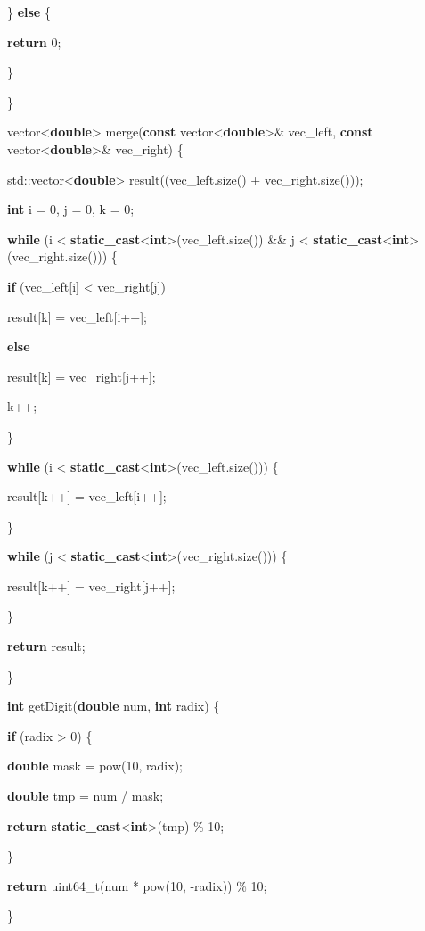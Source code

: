 \documentclass[]{article}
\begin{document}
\} \textbf{else} \{

\textbf{return} 0;

\}

\}

vector\textless{}\textbf{double}\textgreater{} merge(\textbf{const}
vector\textless{}\textbf{double}\textgreater{}\& vec\_left,
\textbf{const} vector\textless{}\textbf{double}\textgreater{}\&
vec\_right) \{

std::vector\textless{}\textbf{double}\textgreater{}
result((vec\_left.size() + vec\_right.size()));

\textbf{int} i = 0, j = 0, k = 0;

\textbf{while} (i \textless{}
\textbf{static\_cast}\textless{}\textbf{int}\textgreater{}(vec\_left.size())
\&\& j \textless{}
\textbf{static\_cast}\textless{}\textbf{int}\textgreater{}(vec\_right.size()))
\{

\textbf{if} (vec\_left{[}i{]} \textless{} vec\_right{[}j{]})

result{[}k{]} = vec\_left{[}i++{]};

\textbf{else}

result{[}k{]} = vec\_right{[}j++{]};

k++;

\}

\textbf{while} (i \textless{}
\textbf{static\_cast}\textless{}\textbf{int}\textgreater{}(vec\_left.size()))
\{

result{[}k++{]} = vec\_left{[}i++{]};

\}

\textbf{while} (j \textless{}
\textbf{static\_cast}\textless{}\textbf{int}\textgreater{}(vec\_right.size()))
\{

result{[}k++{]} = vec\_right{[}j++{]};

\}

\textbf{return} result;

\}

\textbf{int} getDigit(\textbf{double} num, \textbf{int} radix) \{

\textbf{if} (radix \textgreater{} 0) \{

\textbf{double} mask = pow(10, radix);

\textbf{double} tmp = num / mask;

\textbf{return}
\textbf{static\_cast}\textless{}\textbf{int}\textgreater{}(tmp) \% 10;

\}

\textbf{return} uint64\_t(num * pow(10, -radix)) \% 10;

\}
\end{document}
